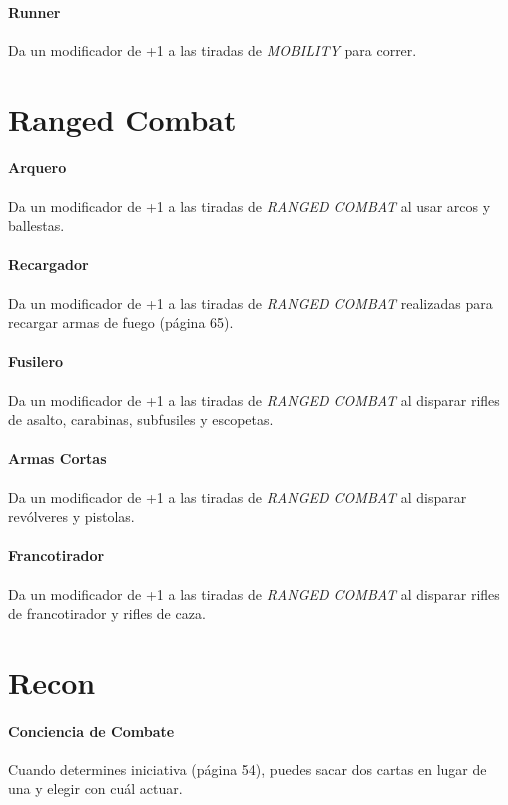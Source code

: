     \paragraph{Runner}
    Da un modificador de +1 a las tiradas de \emph{MOBILITY} para correr.

\section{Ranged Combat}

    \paragraph{Arquero}
    Da un modificador de +1 a las tiradas de \emph{RANGED COMBAT} al usar arcos y ballestas.

    \paragraph{Recargador}
    Da un modificador de +1 a las tiradas de \emph{RANGED COMBAT} realizadas para recargar armas de fuego (página 65).

    \paragraph{Fusilero}
    Da un modificador de +1 a las tiradas de \emph{RANGED COMBAT} al disparar rifles de asalto, carabinas, subfusiles y escopetas.

    \paragraph{Armas Cortas}
    Da un modificador de +1 a las tiradas de \emph{RANGED COMBAT} al disparar revólveres y pistolas.

    \paragraph{Francotirador}
    Da un modificador de +1 a las tiradas de \emph{RANGED COMBAT} al disparar rifles de francotirador y rifles de caza.

\section{Recon}

    \paragraph{Conciencia de Combate}  
    Cuando determines iniciativa (página 54), puedes sacar dos cartas en lugar de una y elegir con cuál actuar.  

